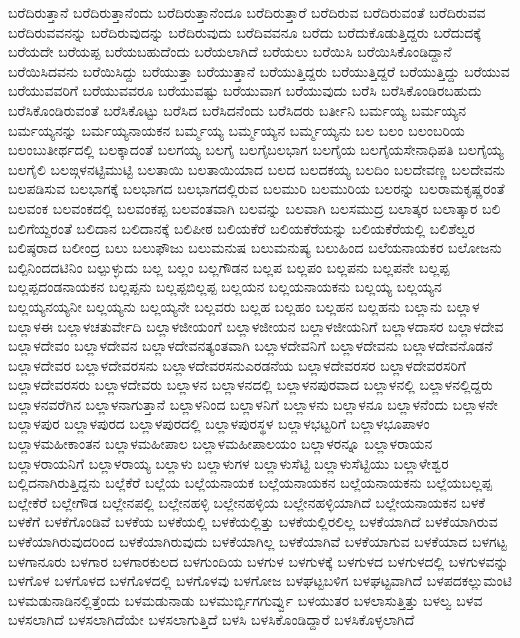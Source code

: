 {ಬರೆದಿರುತ್ತಾನೆ
ಬರೆದಿರುತ್ತಾನೆಂದು
ಬರೆದಿರುತ್ತಾನೆಂದೂ
ಬರೆದಿರುತ್ತಾರೆ
ಬರೆದಿರುವ
ಬರೆದಿರುವಂತೆ
ಬರೆದಿರುವವ
ಬರೆದಿರುವವನನ್ನು
ಬರೆದಿರುವುದನ್ನು
ಬರೆದಿರುವುದು
ಬರೆದಿವವನೂ
ಬರೆದು
ಬರೆದುಕೊಡುತ್ತಿದ್ದರು
ಬರೆದುದಕ್ಕೆ
ಬರೆಯದೇ
ಬರೆಯಪ್ಪ
ಬರೆಯಬಹುದೆಂದು
ಬರೆಯಲಾಗಿದೆ
ಬರೆಯಲು
ಬರೆಯಿಸಿ
ಬರೆಯಿಸಿಕೊಂಡಿದ್ದಾನೆ
ಬರೆಯಿಸಿದವನು
ಬರೆಯಿಸಿದ್ದು
ಬರೆಯುತ್ತಾ
ಬರೆಯುತ್ತಾನೆ
ಬರೆಯುತ್ತಿದ್ದರು
ಬರೆಯುತ್ತಿದ್ದರೆ
ಬರೆಯುತ್ತಿದ್ದು
ಬರೆಯುವ
ಬರೆಯುವವರಿಗೆ
ಬರೆಯುವವರೂ
ಬರೆಯುವಷ್ಟು
ಬರೆಯುವಾಗ
ಬರೆಯುವುದು
ಬರೆಸಿ
ಬರೆಸಿಕೊಂಡಿರಬಹುದು
ಬರೆಸಿಕೊಂಡಿರುವಂತೆ
ಬರೆಸಿಕೊಟ್ಟು
ಬರೆಸಿದ
ಬರೆಸಿದನೆಂದು
ಬರೆಸಿದರು
ಬರ್ತೀನಿ
ಬರ್ಮಯ್ಯ
ಬರ್ಮಯ್ಯನ
ಬರ್ಮಯ್ಯನನ್ನು
ಬರ್ಮಯ್ಯನಾಯಕನ
ಬರ್ಮ್ಮಯ್ಯ
ಬರ್ಮ್ಮಯ್ಯನ
ಬರ್ಮ್ಮಯ್ಯನು
ಬಲ
ಬಲಂ
ಬಲಂಬರಿಯ
ಬಲಂಬುತೀರ್ಥದಲ್ಲಿ
ಬಲಕ್ಕಾದಂತೆ
ಬಲಗಯ್ಯ
ಬಲಗೈ
ಬಲಗೈಬಲಭಾಗ
ಬಲಗೈಯ
ಬಲಗೈಯಸೇನಾಧಿಪತಿ
ಬಲಗೈಯ್ಯ
ಬಲಗೈಲಿ
ಬಲಙ್ಗಳನಟ್ಟಿಮುಟ್ಟಿ
ಬಲತಾಯಿ
ಬಲತಾಯಿಯಾದ
ಬಲದ
ಬಲದಕಯ್ಯ
ಬಲದಿಂ
ಬಲದೇವಣ್ಣ
ಬಲದೇವನು
ಬಲಪಡಿಸುವ
ಬಲಭಾಗಕ್ಕೆ
ಬಲಭಾಗದ
ಬಲಭಾಗದಲ್ಲಿರುವ
ಬಲಮುರಿ
ಬಲಮುರಿಯ
ಬಲರನ್ನು
ಬಲರಾಮಕೃಷ್ಣರಂತೆ
ಬಲವಂಕ
ಬಲವಂಕದಲ್ಲಿ
ಬಲವಂಕಪ್ಪ
ಬಲವಂತವಾಗಿ
ಬಲವನ್ನು
ಬಲವಾಗಿ
ಬಲಸಮುದ್ರ
ಬಲಾತ್ಕರ
ಬಲಾತ್ಕಾರ
ಬಲಿ
ಬಲಿಗೆಯ್ದರಂತೆ
ಬಲಿದಾನ
ಬಲಿದಾನಕ್ಕೆ
ಬಲಿಪೀಠ
ಬಲಿಯಕೆರೆ
ಬಲಿಯಕೆರೆಯನ್ನು
ಬಲಿಯಕೆರೆಯಲ್ಲಿ
ಬಲಿಶೆಲ್ವರ
ಬಲಿಷ್ಠರಾದ
ಬಲೀಂದ್ರ
ಬಲು
ಬಲುಫೌಜು
ಬಲುಮನುಷ
ಬಲುಮನುಷ್ಯ
ಬಲುಹಿಂದ
ಬಲೆಯನಾಯಕರ
ಬಲೋಜನು
ಬಲ್ಪಿನಿಂದದಟಿನಿಂ
ಬಲ್ಪುಳ್ಳುದು
ಬಲ್ಲ
ಬಲ್ಲಂ
ಬಲ್ಲಗೌಡನ
ಬಲ್ಲಪ
ಬಲ್ಲಪಂ
ಬಲ್ಲಪನು
ಬಲ್ಲಪನೇ
ಬಲ್ಲಪ್ಪ
ಬಲ್ಲಪ್ಪದಂಡನಾಯಕನ
ಬಲ್ಲಪ್ಪನು
ಬಲ್ಲಪ್ಪಬಿಲ್ಲಪ್ಪ
ಬಲ್ಲಯನ
ಬಲ್ಲಯನಾಯಕನು
ಬಲ್ಲಯ್ಯ
ಬಲ್ಲಯ್ಯನ
ಬಲ್ಲಯ್ಯನಯ್ಯನೀ
ಬಲ್ಲಯ್ಯನು
ಬಲ್ಲಯ್ಯನೇ
ಬಲ್ಲವರು
ಬಲ್ಲಹ
ಬಲ್ಲಹಂ
ಬಲ್ಲಹನ
ಬಲ್ಲಹನು
ಬಲ್ಲಾನು
ಬಲ್ಲಾಳ
ಬಲ್ಲಾಳಈ
ಬಲ್ಲಾಳಚತುರ್ವೇದಿ
ಬಲ್ಲಾಳಜೀಯಂಗೆ
ಬಲ್ಲಾಳಜೀಯನ
ಬಲ್ಲಾಳಜೀಯನಿಗೆ
ಬಲ್ಲಾಳದಾಸರ
ಬಲ್ಲಾಳದೇವ
ಬಲ್ಲಾಳದೇವಂ
ಬಲ್ಲಾಳದೇವನ
ಬಲ್ಲಾಳದೇವನತ್ಯಂತವಾಗಿ
ಬಲ್ಲಾಳದೇವನಿಗೆ
ಬಲ್ಲಾಳದೇವನು
ಬಲ್ಲಾಳದೇವನೊಡನೆ
ಬಲ್ಲಾಳದೇವರ
ಬಲ್ಲಾಳದೇವರಸನು
ಬಲ್ಲಾಳದೇವರಸನುಎರಡನೆಯ
ಬಲ್ಲಾಳದೇವರಸರ
ಬಲ್ಲಾಳದೇವರಸರಿಗೆ
ಬಲ್ಲಾಳದೇವರಸರು
ಬಲ್ಲಾಳದೇವರು
ಬಲ್ಲಾಳನ
ಬಲ್ಲಾಳನದಲ್ಲಿ
ಬಲ್ಲಾಳನಪುರವಾದ
ಬಲ್ಲಾಳನಲ್ಲಿ
ಬಲ್ಲಾಳನಲ್ಲಿದ್ದರು
ಬಲ್ಲಾಳನವರೆಗಿನ
ಬಲ್ಲಾಳನಾಗುತ್ತಾನೆ
ಬಲ್ಲಾಳನಿಂದ
ಬಲ್ಲಾಳನಿಗೆ
ಬಲ್ಲಾಳನು
ಬಲ್ಲಾಳನೂ
ಬಲ್ಲಾಳನೆಂದು
ಬಲ್ಲಾಳನೇ
ಬಲ್ಲಾಳಪುರ
ಬಲ್ಲಾಳಪುರದ
ಬಲ್ಲಾಳಪುರದಲ್ಲಿ
ಬಲ್ಲಾಳಪುರಸ್ಥಳ
ಬಲ್ಲಾಳಭಟ್ಟರಿಗೆ
ಬಲ್ಲಾಳಭೂಪಾಳಂ
ಬಲ್ಲಾಳಮಹೀಕಾಂತನ
ಬಲ್ಲಾಳಮಹೀಪಾಲ
ಬಲ್ಲಾಳಮಹೀಪಾಲಯಂ
ಬಲ್ಲಾಳರನ್ನೂ
ಬಲ್ಲಾಳರಾಯನ
ಬಲ್ಲಾಳರಾಯನಿಗೆ
ಬಲ್ಲಾಳರಾಯ್ಯ
ಬಲ್ಲಾಳು
ಬಲ್ಲಾಳುಗಳ
ಬಲ್ಲಾಳುಸೆಟ್ಟಿ
ಬಲ್ಲಾಳುಸೆಟ್ಟಿಯು
ಬಲ್ಲಾಳೇಶ್ವರ
ಬಲ್ಲಿದನಾಗಿರುತ್ತಿದ್ದನು
ಬಲ್ಲೆಕೆರೆ
ಬಲ್ಲೆಯ
ಬಲ್ಲೆಯನಾಯಕ
ಬಲ್ಲೆಯನಾಯಕನ
ಬಲ್ಲೆಯನಾಯಕನು
ಬಲ್ಲೆಯಬಲ್ಲಪ್ಪ
ಬಲ್ಲೇಕೆರೆ
ಬಲ್ಲೇಗೌಡ
ಬಲ್ಲೇನಪಲ್ಲಿ
ಬಲ್ಲೇನಹಳ್ಳಿ
ಬಲ್ಲೇನಹಳ್ಳಿಯ
ಬಲ್ಲೇನಹಳ್ಳಿಯಾಗಿದೆ
ಬಲ್ಲೇಯನಾಯಕನ
ಬಳಕೆ
ಬಳಕೆಗೆ
ಬಳಕೆಗೊಂಡಿವೆ
ಬಳಕೆಯ
ಬಳಕೆಯಲ್ಲಿ
ಬಳಕೆಯಲ್ಲಿತ್ತು
ಬಳಕೆಯಲ್ಲಿರಲಿಲ್ಲ
ಬಳಕೆಯಾಗಿದೆ
ಬಳಕೆಯಾಗಿರುವ
ಬಳಕೆಯಾಗಿರುವುದರಿಂದ
ಬಳಕೆಯಾಗಿರುವುದು
ಬಳಕೆಯಾಗಿಲ್ಲ
ಬಳಕೆಯಾಗಿವೆ
ಬಳಕೆಯಾಗುವ
ಬಳಕೆಯಾದ
ಬಳಗಟ್ಟ
ಬಳಗಾನೂರು
ಬಳಗಾರ
ಬಳಗಾರಕುಲದ
ಬಳಗುಂದಿಯ
ಬಳಗುಳ
ಬಳಗುಳಕ್ಕೆ
ಬಳಗುಳದ
ಬಳಗುಳದಲ್ಲಿ
ಬಳಗುಳವನ್ನು
ಬಳಗೊಳ
ಬಳಗೊಳದ
ಬಳಗೊಳದಲ್ಲಿ
ಬಳಗೊಳವು
ಬಳಗೋಜ
ಬಳಘಟ್ಟಬಳಿಗ
ಬಳಘಟ್ಟವಾಗಿದೆ
ಬಳಪದಕಲ್ಲುಮಂಟಿ
ಬಳಮಡುನಾಡಿನಲ್ಲಿತ್ತೆಂದು
ಬಳಮಡುನಾಡು
ಬಳಮುರ್ಬ್ಬಿಗಗುರ್ವ್ವು
ಬಳಯುತರ
ಬಳಲಾಸುತ್ತಿತ್ತು
ಬಳಲ್ವ
ಬಳವ
ಬಳಸಲಾಗಿದೆ
ಬಳಸಲಾಗಿದೆಯೇ
ಬಳಸಲಾಗುತ್ತಿದೆ
ಬಳಸಿ
ಬಳಸಿಕೊಂಡಿದ್ದಾರೆ
ಬಳಸಿಕೊಳ್ಳಲಾಗಿದೆ
}
